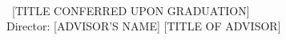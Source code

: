 \begin{center}
    \MyTitle \\
    \vspace*{0.5\baselineskip}
    \MyAuthor~[TITLE CONFERRED UPON GRADUATION] \\
    \vspace*{0.5\baselineskip}
    Director: [ADVISOR'S NAME] [TITLE OF ADVISOR]
\end{center}
\thispagestyle{empty}

\begingroup
\renewcommand{\clearpage}{}
\singlespacing



\lipsum[4-10]

\noindent
\thispagestyle{empty}

\endgroup


